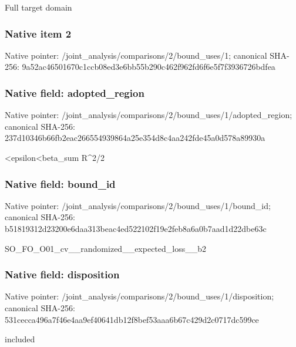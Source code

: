 \documentclass[10pt,a4paper]{article}
\begin{document}
\begingroup\raggedright\sloppy Full target domain\par\endgroup

\subsubsection{Native item 2}
Native pointer: /joint\_\allowbreak{}analysis/comparisons/2/bound\_\allowbreak{}uses/1; canonical SHA-256: 9a52ac46501670c1ccb08ed3e6bb55b290c462f962fd6f6e5f7f3936726bdfea

\subsubsection{Native field: adopted\_\allowbreak{}region}
Native pointer: /joint\_\allowbreak{}analysis/comparisons/2/bound\_\allowbreak{}uses/1/adopted\_\allowbreak{}region; canonical SHA-256: 237d10346b66fb2eac266554939864a25e354d8c4aa242fde45a0d578a89930a

\begingroup\raggedright{}<epsilon<beta\_\allowbreak{}sum R\textasciicircum{}2/\allowbreak{}2\par\endgroup

\subsubsection{Native field: bound\_\allowbreak{}id}
Native pointer: /joint\_\allowbreak{}analysis/comparisons/2/bound\_\allowbreak{}uses/1/bound\_\allowbreak{}id; canonical SHA-256: b51819312d23200e6daa313beac4ed522102f19e2feb8a6a0b7aad1d22dbe63c

\begingroup\raggedright\sloppy SO\_\allowbreak{}FO\_\allowbreak{}O01\_\allowbreak{}cv\_\allowbreak{}\_\allowbreak{}randomized\_\allowbreak{}\_\allowbreak{}expected\_\allowbreak{}loss\_\allowbreak{}\_\allowbreak{}b2\par\endgroup

\subsubsection{Native field: disposition}
Native pointer: /joint\_\allowbreak{}analysis/comparisons/2/bound\_\allowbreak{}uses/1/disposition; canonical SHA-256: 531cecca496a7f46e4aa9ef40641db12f8bef53aaa6b67c429d2c0717dc599ce

\begingroup\raggedright\sloppy included\par\endgroup
\end{document}
